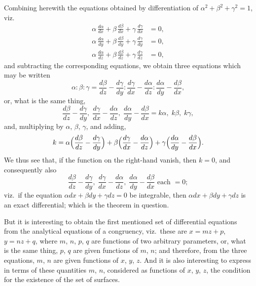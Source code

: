 \documentclass[11pt,a4paper]{book}
\begin{document}
Combining herewith the equations obtained by differentiation of $\alpha^2 + \beta^2 + \gamma^2 = 1$, viz.
\begin{align*}
\alpha\,\frac{d\alpha}{dx} + \beta\,\frac{d\beta}{dx} + \gamma\,\frac{d\gamma}{dx} &= 0, \\
\alpha\,\frac{d\alpha}{dy} + \beta\,\frac{d\beta}{dy} + \gamma\,\frac{d\gamma}{dy} &= 0, \\
\alpha\,\frac{d\alpha}{dz} + \beta\,\frac{d\beta}{dz} + \gamma\,\frac{d\gamma}{dz} &= 0,
\end{align*}
and subtracting the corresponding equations, we obtain three equations which may be written
\[
\alpha : \beta : \gamma = \frac{d\beta}{dz} - \frac{d\gamma}{dy} : \frac{d\gamma}{dx} - \frac{d\alpha}{dz} : \frac{d\alpha}{dy} - \frac{d\beta}{dx},
\]
or, what is the same thing,
\[
\frac{d\beta}{dz} - \frac{d\gamma}{dy},\; \frac{d\gamma}{dx} - \frac{d\alpha}{dz},\; \frac{d\alpha}{dy} - \frac{d\beta}{dx} = k\alpha,\; k\beta,\; k\gamma,
\]
and, multiplying by $\alpha$, $\beta$, $\gamma$, and adding,
\[
k = \alpha\Bigl(\frac{d\beta}{dz} - \frac{d\gamma}{dy}\Bigr) + \beta\Bigl(\frac{d\gamma}{dx} - \frac{d\alpha}{dz}\Bigr) + \gamma\Bigl(\frac{d\alpha}{dy} - \frac{d\beta}{dx}\Bigr).
\]
We thus see that, if the function on the right-hand vanish, then $k=0$, and consequently also
\[
\frac{d\beta}{dz} - \frac{d\gamma}{dy},\; \frac{d\gamma}{dx} - \frac{d\alpha}{dz},\; \frac{d\alpha}{dy} - \frac{d\beta}{dx} \text{ each } = 0;
\]
viz.\ if the equation $\alpha dx + \beta dy + \gamma dz = 0$ be integrable, then $\alpha dx + \beta dy + \gamma dz$ is an exact differential; which is the theorem in question.

But it is interesting to obtain the first mentioned set of differential equations from the analytical equations of a congruency, viz.\ these are $x = mz + p$, $y = nz + q$, where $m$, $n$, $p$, $q$ are functions of two arbitrary parameters, or, what is the same thing, $p$, $q$ are given functions of $m$, $n$; and therefore, from the three equations, $m$, $n$ are given functions of $x$, $y$, $z$. And it is also interesting to express in terms of these quantities $m$, $n$, considered as functions of $x$, $y$, $z$, the condition for the existence of the set of surfaces.
\end{document}
